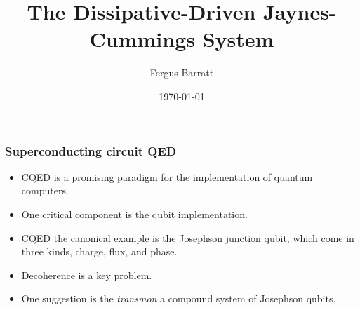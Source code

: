 \documentclass{beamer}
\title{The Dissipative-Driven Jaynes-Cummings System}
\date{\today}
\author{Fergus Barratt}
\begin{document}
\maketitle

\begin{frame}

    \frametitle{Superconducting circuit QED}         

    \begin{itemize}

        \item CQED is a promising paradigm for the implementation of 
                quantum computers. 
        \item One critical component is the qubit implementation.
        \item CQED the canonical example is the Josephson junction 
                qubit, which come in three kinds, charge, flux, and 
                phase. 
        \item Decoherence is a key problem.
        \item One suggestion is the \emph{transmon}
                a compound system of Josephson qubits.

    \end{itemize}

\end{frame}
\end{document}
